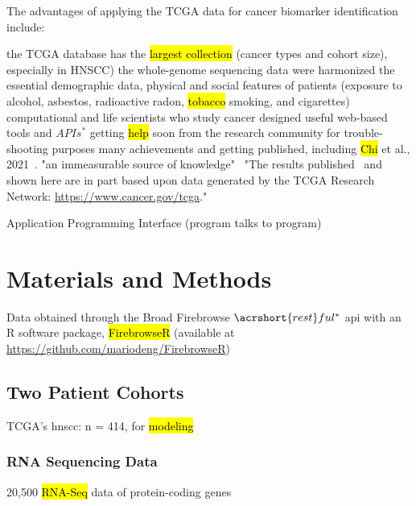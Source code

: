 \documentclass[
paper=landscape,
paper=160mm:90mm, %
fontsize=11pt, %
pagesize, %
parskip=half-, %
]{scrartcl} %
\theoremstyle{mythmstyle} %
\begin{document}
\clearpage

\thispagestyle{headings}

The advantages of applying the TCGA data for cancer biomarker identification include:
\begin{outline}
\1  the TCGA database has the \hl{largest collection} (cancer types and cohort size), especially in HNSCC)
\2 the whole-genome sequencing data were harmonized
\2 the essential demographic data, physical and social features of patients (exposure to alcohol, asbestos, radioactive radon, \hl{tobacco} smoking, and cigarettes)
\2 computational and life scientists who study cancer designed useful web-based tools and $APIs^{*}$
\1 getting \hl{help} soon from the research community for trouble-shooting purposes
\1 many achievements and getting published, including \hl{Chi} et al., 2021~\cite{Chi2021}.
    \2 "an immeasurable source of knowledge"~\cite{Tomczak2015}
    \2 "The results published~\cite{Chi2021} and shown here are in part based upon data generated by the TCGA Research Network: \url{https://www.cancer.gov/tcga}."
\end{outline}

\tiny * Application Programming Interface (program talks to program)

\clearpage

\section{Materials and Methods} %

\large Data obtained through the Broad Firebrowse $\acrshort{rest}ful^{*}$ \acrshort{api} with an R software package, \hl{FirebrowseR} (available at \url{https://github.com/mariodeng/FirebrowseR})~\cite{Deng2017}

\subsection{Two Patient Cohorts} 
\large TCGA's \acrfull{hnscc}: n = 414, for \hl{modeling}\\ %

\subsubsection{RNA Sequencing Data} 
20,500 \hl{RNA-Seq} data of protein-coding genes\\%
\end{document}
